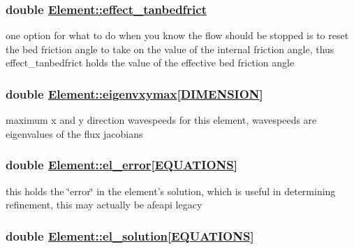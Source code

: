 \hypertarget{classElement_r45}{
\subsubsection[effect\_\-tanbedfrict]{\setlength{\rightskip}{0pt plus 5cm}double \hyperlink{classElement_r45}{Element::effect\_\-tanbedfrict}}}
\label{classElement_r45}


one option for what to do when you know the flow should be stopped is to reset the bed friction angle to take on the value of the internal friction angle, thus effect\_\-tanbedfrict holds the value of the effective bed friction angle 

\hypertarget{classElement_r34}{
\subsubsection[eigenvxymax]{\setlength{\rightskip}{0pt plus 5cm}double \hyperlink{classElement_r34}{Element::eigenvxymax}\mbox{[}\hyperlink{constant_8h_a15}{DIMENSION}\mbox{]}}}
\label{classElement_r34}


maximum x and y direction wavespeeds for this element, wavespeeds are eigenvalues of the flux jacobians 

\hypertarget{classElement_r17}{
\subsubsection[el\_\-error]{\setlength{\rightskip}{0pt plus 5cm}double \hyperlink{classElement_r17}{Element::el\_\-error}\mbox{[}\hyperlink{constant_8h_a16}{EQUATIONS}\mbox{]}}}
\label{classElement_r17}


this holds the \char`\"{}error\char`\"{} in the element's solution, which is useful in determining refinement, this may actually be afeapi legacy 

\hypertarget{classElement_r18}{
\subsubsection[el\_\-solution]{\setlength{\rightskip}{0pt plus 5cm}double \hyperlink{classElement_r18}{Element::el\_\-solution}\mbox{[}\hyperlink{constant_8h_a16}{EQUATIONS}\mbox{]}}}
\label{classElement_r18}


